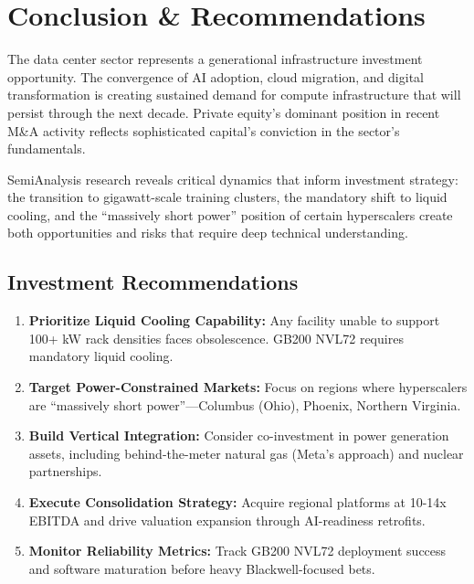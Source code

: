 \documentclass[11pt,a4paper]{article}
\begin{document}
\newpage

\section{Conclusion \& Recommendations}

The data center sector represents a generational infrastructure investment opportunity. The convergence of AI adoption, cloud migration, and digital transformation is creating sustained demand for compute infrastructure that will persist through the next decade. Private equity's dominant position in recent M\&A activity reflects sophisticated capital's conviction in the sector's fundamentals.

SemiAnalysis research reveals critical dynamics that inform investment strategy: the transition to gigawatt-scale training clusters, the mandatory shift to liquid cooling, and the ``massively short power'' position of certain hyperscalers create both opportunities and risks that require deep technical understanding.

\subsection*{Investment Recommendations}

\begin{enumerate}[leftmargin=*, itemsep=6pt]
    \item \textbf{Prioritize Liquid Cooling Capability:} Any facility unable to support 100+ kW rack densities faces obsolescence. GB200 NVL72 requires mandatory liquid cooling.
    
    \item \textbf{Target Power-Constrained Markets:} Focus on regions where hyperscalers are ``massively short power''—Columbus (Ohio), Phoenix, Northern Virginia.
    
    \item \textbf{Build Vertical Integration:} Consider co-investment in power generation assets, including behind-the-meter natural gas (Meta's approach) and nuclear partnerships.
    
    \item \textbf{Execute Consolidation Strategy:} Acquire regional platforms at 10-14x EBITDA and drive valuation expansion through AI-readiness retrofits.
    
    \item \textbf{Monitor Reliability Metrics:} Track GB200 NVL72 deployment success and software maturation before heavy Blackwell-focused bets.
\end{enumerate}
\end{document}
